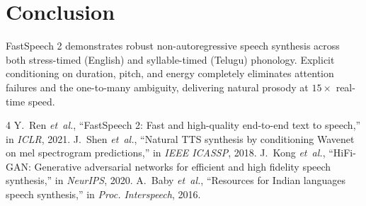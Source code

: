 \documentclass[10pt,twocolumn,a4paper]{article}
\begin{document}
\section{Conclusion}
FastSpeech 2 demonstrates robust non-autoregressive speech synthesis across both stress-timed (English) and syllable-timed (Telugu) phonology. Explicit conditioning on duration, pitch, and energy completely eliminates attention failures and the one-to-many ambiguity, delivering natural prosody at $15\times$ real-time speed.

\begin{thebibliography}{4}
Y.~Ren \emph{et~al.}, ``FastSpeech 2: Fast and high-quality end-to-end text to speech,'' in \emph{ICLR}, 2021.
J.~Shen \emph{et~al.}, ``Natural TTS synthesis by conditioning Wavenet on mel spectrogram predictions,'' in \emph{IEEE ICASSP}, 2018.
J.~Kong \emph{et~al.}, ``HiFi-GAN: Generative adversarial networks for efficient and high fidelity speech synthesis,'' in \emph{NeurIPS}, 2020.
A.~Baby \emph{et~al.}, ``Resources for Indian languages speech synthesis,'' in \emph{Proc. Interspeech}, 2016.
\end{thebibliography}
\end{document}
